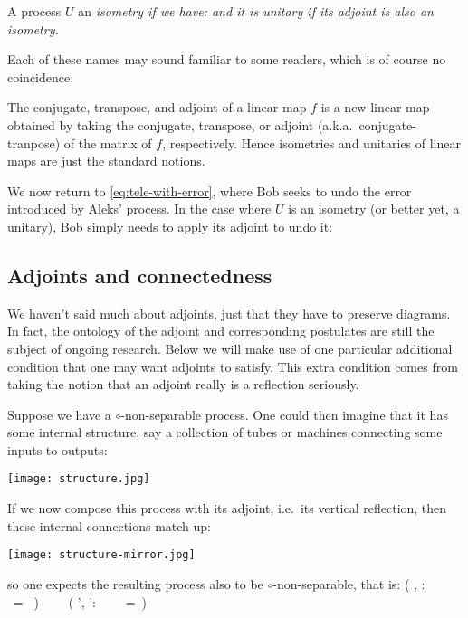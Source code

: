 \documentclass[12pt]{article}
\begin{document}
\begin{definition}
A process $U$ an \em isometry \em if we have:     
\beq\label{eq:isometry}
\eeq
and it is \em unitary \em if its adjoint is also an isometry.    
\end{definition}

Each of these names may sound familiar to  some readers, which is of course no coincidence: 

\begin{example}
  The conjugate, transpose, and adjoint of a linear map $f$ is a new linear map obtained by taking the conjugate, transpose, or adjoint (a.k.a.~conjugate-tranpose) of the matrix of $f$, respectively. Hence isometries and unitaries of linear maps are just the standard notions.
\end{example}

We now return to \eqref{eq:tele-with-error}, where Bob seeks to undo the error introduced by Aleks' process. In the case where $U$ is an isometry (or better yet, a unitary), Bob simply needs to apply its adjoint to undo it:

\subsection{Adjoints and connectedness} 

We haven't said much about adjoints, just that they have to preserve diagrams.  In fact, the ontology of the adjoint and corresponding postulates are still the subject of ongoing research.  Below we will make use of one particular additional condition  that one may want  adjoints to satisfy.  This extra condition comes from taking the notion that an adjoint really is a reflection seriously.

Suppose we have a $\circ$-non-separable process.  One could then imagine  that it has some internal structure, say a collection of tubes or machines connecting some inputs to outputs: 
\begin{center}
  \texttt{[image: structure.jpg]}
\end{center}
If we now compose this process with its adjoint, i.e.~its vertical reflection, then these internal  connections match up:
\begin{center}
  \texttt{[image: structure-mirror.jpg]}
\end{center}
so one expects the resulting process also to be $\circ$-non-separable, that is:
\beq\label{EQ:daggeraxiom}
\left( \exists \psi, \phi: \ \  \ =\ \kpointketbra{\psi}{\phi} \right)
  \ \ \Longleftrightarrow\ \
 \left( \exists \psi', \phi':  \ \   \ \ =\ \right)  
\eeq
\end{document}
